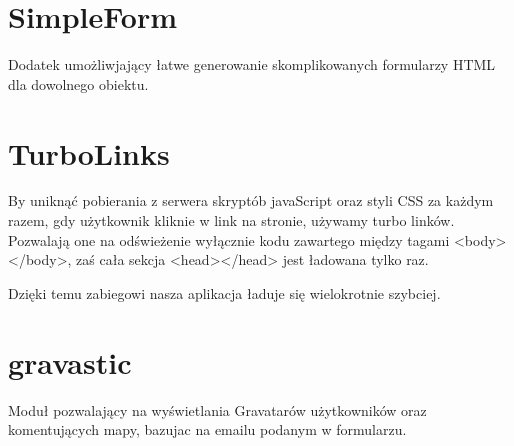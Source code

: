 \section{SimpleForm}
Dodatek umożliwjający łatwe generowanie skomplikowanych formularzy HTML dla dowolnego obiektu.

\section{TurboLinks}
By uniknąć pobierania z serwera skryptób javaScript oraz styli CSS za każdym razem, gdy użytkownik kliknie w link na stronie, używamy turbo linków. Pozwalają one na odświeżenie wyłącznie kodu zawartego między tagami <body></body>, zaś cała sekcja <head></head> jest ładowana tylko raz.

Dzięki temu zabiegowi nasza aplikacja ładuje się wielokrotnie szybciej.

\section{gravastic}
Moduł pozwalający na wyświetlania Gravatarów użytkowników oraz komentujących mapy, bazujac na emailu podanym w formularzu.
